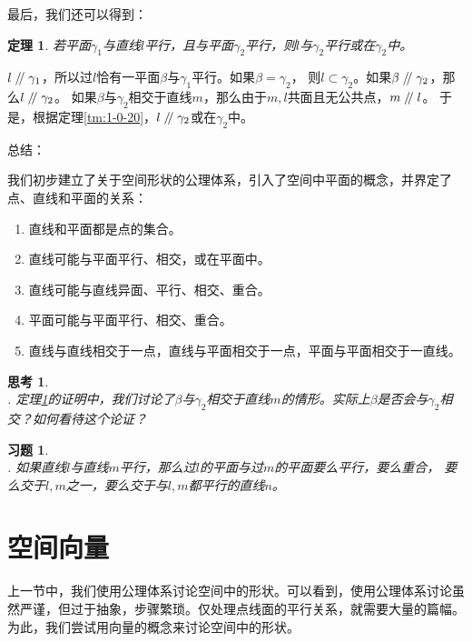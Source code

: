 \documentclass[12pt,UTF8]{ctexbook}
\newtheorem{tm}{定理}[section]
\newtheorem{sk}{思考}[section]
\renewcommand\parallel{\mathrel{/\mskip-4mu/}}
\newtheorem{xt}{习题}[section]
\begin{document}
最后，我们还可以得到：
\begin{tm}\label{tm:1-0-100}
    若平面$\gamma_1$与直线$l$平行，且与平面$\gamma_2$平行，则$l$与$\gamma_2$平行或在$\gamma_2$中。
\end{tm}
\begin{proof2}
    $l\parallel \gamma_1$，所以过$l$恰有一平面$\beta$与$\gamma_1$平行。如果$\beta=\gamma_2$，
    则$l\subset\gamma_2$。如果$\beta\parallel\gamma_2$，那么$l\parallel \gamma_2$。
    如果$\beta$与$\gamma_2$相交于直线$m$，那么由于$m,l$共面且无公共点，$m\parallel l$。
    于是，根据定理\ref{tm:1-0-20}，$l\parallel \gamma_2$或在$\gamma_2$中。
\end{proof2}

总结：

我们初步建立了关于空间形状的公理体系，引入了空间中平面的概念，并界定了点、直线和平面的关系：
\begin{enumerate}
    \item 直线和平面都是点的集合。
    \item 直线可能与平面平行、相交，或在平面中。
    \item 直线可能与直线异面、平行、相交、重合。
    \item 平面可能与平面平行、相交、重合。
    \item 直线与直线相交于一点，直线与平面相交于一点，平面与平面相交于一直线。
\end{enumerate}


\begin{sk}
    \mbox{} \\
    . 定理\ref{tm:1-0-100}的证明中，我们讨论了$\beta$与$\gamma_2$相交于直线$m$的情形。实际上$\beta$是否会与$\gamma_2$相交？如何看待这个论证？
\end{sk}

\begin{xt}
    \mbox{} \\
    . 如果直线$l$与直线$m$平行，那么过$l$的平面与过$m$的平面要么平行，要么重合，
    要么交于$l,m$之一，要么交于与$l,m$都平行的直线$n$。 
\end{xt}


\section{空间向量}

上一节中，我们使用公理体系讨论空间中的形状。可以看到，使用公理体系讨论虽然严谨，但过于抽象，步骤繁琐。仅处理点线面的平行关系，就需要大量的篇幅。为此，我们尝试用向量的概念来讨论空间中的形状。
\end{document}
